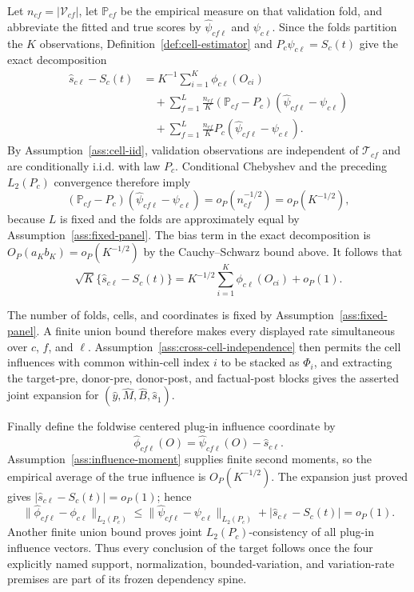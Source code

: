 Let \(n_{cf}=|\mathcal V_{cf}|\), let \(\mathbb P_{cf}\) be the empirical measure on that validation fold, and abbreviate the fitted and true scores by \(\widehat\psi_{cf\ell}\) and \(\psi_{c\ell}\).  Since the folds partition the \(K\) observations, Definition~\ref{def:cell-estimator} and \(P_c\psi_{c\ell}=S_c(t)\) give the exact decomposition
\[
\begin{aligned}
\widehat s_{c\ell}-S_c(t)
&=K^{-1}\sum_{i=1}^K\phi_{c\ell}(O_{ci})\\
&\quad+\sum_{f=1}^L\frac{n_{cf}}K
(\mathbb P_{cf}-P_c)
(\widehat\psi_{cf\ell}-\psi_{c\ell})\\
&\quad+\sum_{f=1}^L\frac{n_{cf}}K
P_c(\widehat\psi_{cf\ell}-\psi_{c\ell}).
\end{aligned}
\]
By Assumption~\ref{ass:cell-iid}, validation observations are independent of \(\mathcal T_{cf}\) and are conditionally i.i.d. with law \(P_c\).  Conditional Chebyshev and the preceding \(L_2(P_c)\) convergence therefore imply
\[
(\mathbb P_{cf}-P_c)
(\widehat\psi_{cf\ell}-\psi_{c\ell})
=o_P(n_{cf}^{-1/2})=o_P(K^{-1/2}),
\]
because \(L\) is fixed and the folds are approximately equal by Assumption~\ref{ass:fixed-panel}.  The bias term in the exact decomposition is \(O_P(a_Kb_K)=o_P(K^{-1/2})\) by the Cauchy--Schwarz bound above.  It follows that
\[
\sqrt K\{\widehat s_{c\ell}-S_c(t)\}
=K^{-1/2}\sum_{i=1}^K\phi_{c\ell}(O_{ci})+o_P(1).
\]

The number of folds, cells, and coordinates is fixed by Assumption~\ref{ass:fixed-panel}.  A finite union bound therefore makes every displayed rate simultaneous over \(c\), \(f\), and \(\ell\).  Assumption~\ref{ass:cross-cell-independence} then permits the cell influences with common within-cell index \(i\) to be stacked as \(\Phi_i\), and extracting the target-pre, donor-pre, donor-post, and factual-post blocks gives the asserted joint expansion for \((\widehat y,\widehat M,\widehat B,\widehat s_1)\).

Finally define the foldwise centered plug-in influence coordinate by
\[
\widehat\phi_{cf\ell}(O)=
\widehat\psi_{cf\ell}(O)-\widehat s_{c\ell}.
\]
Assumption~\ref{ass:influence-moment} supplies finite second moments, so the empirical average of the true influence is \(O_P(K^{-1/2})\).  The expansion just proved gives \(|\widehat s_{c\ell}-S_c(t)|=o_P(1)\); hence
\[
\|\widehat\phi_{cf\ell}-\phi_{c\ell}\|_{L_2(P_c)}
\le
\|\widehat\psi_{cf\ell}-\psi_{c\ell}\|_{L_2(P_c)}
+|\widehat s_{c\ell}-S_c(t)|
=o_P(1).
\]
Another finite union bound proves joint \(L_2(P_c)\)-consistency of all plug-in influence vectors.  Thus every conclusion of the target follows once the four explicitly named support, normalization, bounded-variation, and variation-rate premises are part of its frozen dependency spine.
